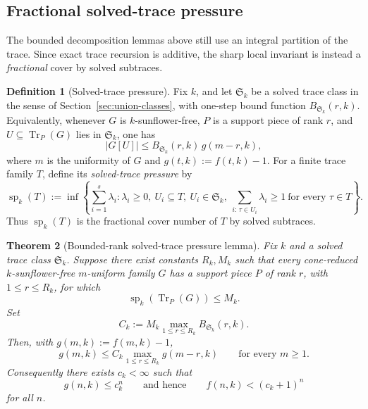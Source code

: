 \documentclass[11pt]{article}
\newtheorem{theorem}{Theorem}[section]
\theoremstyle{definition}
\newtheorem{definition}[theorem]{Definition}
\newcommand{\Tr}{\operatorname{Tr}}
\newcommand{\1}{\mathbf{1}}
\begin{document}
\subsection*{Fractional solved-trace pressure}
The bounded decomposition lemmas above still use an integral partition of the trace. Since exact trace recursion is additive, the sharp local invariant is instead a \emph{fractional} cover by solved subtraces.

\begin{definition}[Solved-trace pressure]\label{def:solved-trace-pressure}
Fix $k$, and let $\mathfrak S_k$ be a solved trace class in the sense of Section~\ref{sec:union-classes}, with one-step bound function $B_{\mathfrak S_k}(r,k)$. Equivalently, whenever $G$ is $k$-sunflower-free, $P$ is a support piece of rank $r$, and $U\subseteq \Tr_P(G)$ lies in $\mathfrak S_k$, one has
\[
|G[U]|\le B_{\mathfrak S_k}(r,k)\,g(m-r,k),
\]
where $m$ is the uniformity of $G$ and $g(t,k):=f(t,k)-1$. For a finite trace family $T$, define its \emph{solved-trace pressure} by
\[
\operatorname{sp}_k(T):=
\inf\left\{
\sum_{i=1}^s \lambda_i :
\lambda_i\ge 0,\ U_i\subseteq T,\ U_i\in \mathfrak S_k,\ 
\sum_{i:\,\tau\in U_i}\lambda_i\ge 1\ \text{for every }\tau\in T
\right\}.
\]
Thus $\operatorname{sp}_k(T)$ is the fractional cover number of $T$ by solved subtraces.
\end{definition}

\begin{theorem}[Bounded-rank solved-trace pressure lemma]\label{thm:solved-trace-pressure}
Fix $k$ and a solved trace class $\mathfrak S_k$. Suppose there exist constants $R_k,M_k$ such that every cone-reduced $k$-sunflower-free $m$-uniform family $G$ has a support piece $P$ of rank $r$, with $1\le r\le R_k$, for which
\[
\operatorname{sp}_k(\Tr_P(G))\le M_k.
\]
Set
\[
C_k:=M_k\max_{1\le r\le R_k} B_{\mathfrak S_k}(r,k).
\]
Then, with $g(m,k):=f(m,k)-1$,
\[
g(m,k)\le C_k\max_{1\le r\le R_k} g(m-r,k)
\qquad\text{for every }m\ge 1.
\]
Consequently there exists $c_k<\infty$ such that
\[
g(n,k)\le c_k^n
\qquad\text{and hence}\qquad
f(n,k)<(c_k+1)^n
\]
for all $n$.
\end{theorem}
\end{document}
